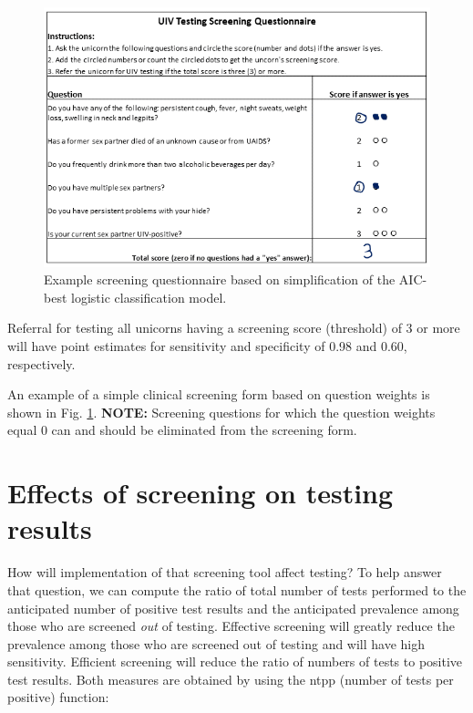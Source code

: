 \documentclass[11pt]{report}
\begin{document}
\begin{figure}[hp]
  \begin{center}
    \includegraphics[clip=true,width=1.0\textwidth]{UniTool}
    \caption{Example screening questionnaire based on simplification
      of the AIC-best logistic classification model.}
    \label{fig:f5}
\end{center}
\end{figure}
Referral for testing all unicorns having a screening score (threshold)
of 3 or more will have point estimates for sensitivity and specificity
of 0.98 and 0.60, respectively.

An example of a simple clinical
screening form based on question weights is shown in
Fig. \ref{fig:f5}. \textbf{NOTE:} Screening questions for which the
question weights equal 0 can and should be eliminated from the
screening form.

\section*{Effects of screening on testing results}

How will implementation of that screening tool affect testing? To help
answer that question, we can compute the ratio of total number of
tests performed to the anticipated number of positive test results and
the anticipated prevalence among those who are screened \emph{out} of
testing.  Effective screening will greatly
reduce the prevalence among those who are screened out of testing and
will have high sensitivity. Efficient screening will reduce the ratio of numbers of
tests to positive test results.
Both measures are obtained by using the \textsf{ntpp} (number of tests per
positive) function:
\end{document}

